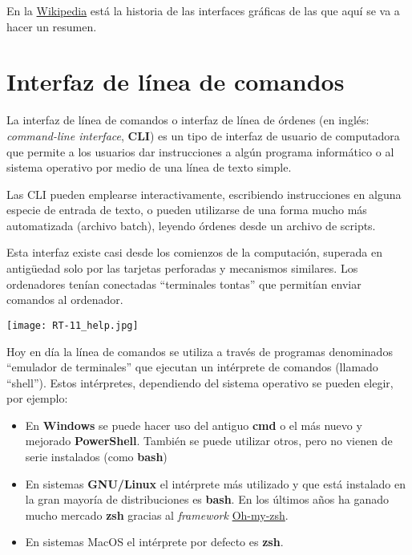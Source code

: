 En la \href{https://en.wikipedia.org/wiki/History_of_the_graphical_user_interface}{Wikipedia} está la historia de las interfaces gráficas de las que aquí se va a hacer un resumen.


\section{Interfaz de línea de comandos}

La interfaz de línea de comandos o interfaz de línea de órdenes (en inglés: \textit{command-line interface}, \textbf{CLI}) es un tipo de interfaz de usuario de computadora que permite a los usuarios dar instrucciones a algún programa informático o al sistema operativo por medio de una línea de texto simple.

Las CLI pueden emplearse interactivamente, escribiendo instrucciones en alguna especie de entrada de texto, o pueden utilizarse de una forma mucho más automatizada (archivo batch), leyendo órdenes desde un archivo de scripts.

Esta interfaz existe casi desde los comienzos de la computación, superada en antigüedad solo por las tarjetas perforadas y mecanismos similares. Los ordenadores tenían conectadas “terminales tontas” que permitían enviar comandos al ordenador.

\vspace{-10pt}
\begin{center}
    \texttt{[image: RT-11\_help.jpg]}
    \vspace{-10pt}
\end{center}

Hoy en día la línea de comandos se utiliza a través de programas denominados “emulador de terminales” que ejecutan un intérprete de comandos (llamado “shell”). Estos intérpretes, dependiendo del sistema operativo se pueden elegir, por ejemplo:

\begin{itemize}
    \item En \textbf{Windows} se puede hacer uso del antiguo \textbf{cmd} o el más nuevo y mejorado \textbf{PowerShell}. También se puede utilizar otros, pero no vienen de serie instalados (como \textbf{bash})
    \item En sistemas \textbf{GNU/Linux} el intérprete más utilizado y que está instalado en la gran mayoría de distribuciones es \textbf{bash}. En los últimos años ha ganado mucho mercado \textbf{zsh} gracias al \textit{framework} \href{https://ohmyz.sh/}{Oh-my-zsh}.

    \item En sistemas MacOS el intérprete por defecto es \textbf{zsh}.
\end{itemize}

